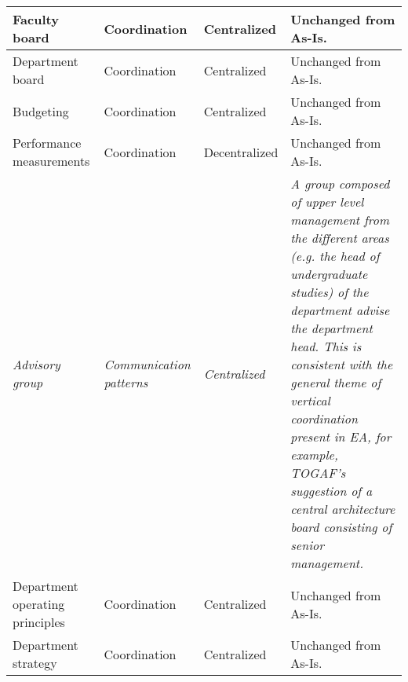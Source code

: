 \begin{center}
\begin{longtable}{ | p{} | p{}| p{} | p{}|}
 Faculty board &
 Coordination &
 Centralized &
 Unchanged from As-Is. \\
%
\hline
%
%
 Department board &
 Coordination &
 Centralized &
 Unchanged from As-Is. \\
%
\hline
%
 Budgeting &
 Coordination &
 Centralized &
 Unchanged from As-Is. \\
%
\hline
%
%
 Performance measurements &
 Coordination &
 Decentralized &
 Unchanged from As-Is.  \\
%
\hline
%
 \textit{Advisory group} &
 \textit{Communication patterns} &
 \textit{Centralized} &
 \textit{A group composed of upper level management from the different areas (e.g. the head of undergraduate studies) of the department advise the department head. This is consistent with the general theme of vertical coordination present in EA, for example, TOGAF's suggestion of a central architecture board consisting of senior management.} \\ %
%
\hline
%
%
 Department operating principles &
 Coordination &
 Centralized &
 Unchanged from As-Is. \\
%
\hline
%
%
 Department strategy &
 Coordination &
 Centralized &
 Unchanged from As-Is. \\
%
\hline

\end{longtable}
\end{center}

